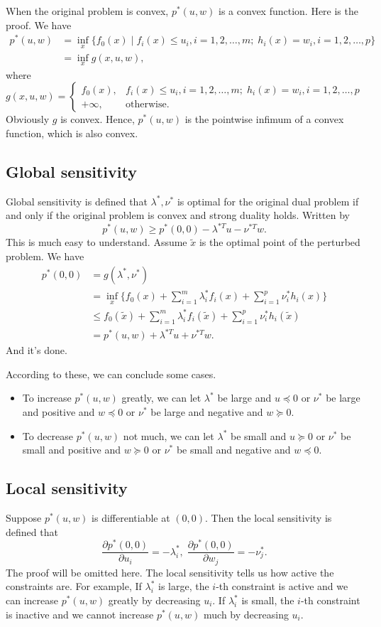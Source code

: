 \documentclass[lang=en,color=blue,mode=fancy,titlestyle=hang]{elegantbook}
\begin{document}
When the original problem is convex, $p^*(u, w)$ is a convex function. Here is the proof. We have
\begin{align*}
p^*(u, w) &= \inf_x \{f_0(x) \;|\; f_i(x) \leq u_i, i = 1, 2, \ldots, m; \; h_i(x) = w_i, i = 1, 2, \ldots, p\}\\
&= \inf_x g(x, u, w),
\end{align*}
where \[
g(x, u, w) = \begin{cases}
f_0(x), & f_i(x) \leq u_i, i = 1, 2, \ldots, m; \; h_i(x) = w_i, i = 1, 2, \ldots, p\\
+ \infty, & \text{otherwise}.
\end{cases}
\]
Obviously $g$ is convex. Hence, $p^*(u, w)$ is the pointwise infimum of a  convex function, which is
also convex.

\subsection{Global sensitivity}
Global sensitivity is defined that $\lambda^*, \nu^*$ is optimal for the original dual problem
if and only if the original problem is convex and strong duality holds. Written by
\[
p^*(u, w) \geq p^*(0, 0) - \lambda^{*T} u - \nu^{*T} w.
\]
This is much easy to understand. Assume $\tilde{x}$ is the optimal point of the perturbed problem.
We have
\begin{align*}
p^*(0, 0) &= g(\lambda^*, \nu^*)\\
&= \inf_x \{f_0(x) + \sum_{i=1}^m \lambda_i^* f_i(x) + \sum_{i=1}^p \nu_i^* h_i(x)\}\\
&\leq f_0(\tilde{x}) + \sum_{i=1}^m \lambda_i^* f_i(\tilde{x}) + \sum_{i=1}^p \nu_i^* h_i(\tilde{x})\\
&= p^*(u, w) + \lambda^{*T} u + \nu^{*T} w.
\end{align*}
And it's done.

According to these, we can conclude some cases.
\begin{itemize}
  \item To increase $p^*(u, w)$ greatly, we can let $\lambda^*$ be large and $u \preceq 0$
  or $\nu^*$ be large and positive and $w \preceq 0$ or $\nu^*$ be large and negative and $w \succeq 0$.
  \item To decrease $p^*(u, w)$ not much, we can let $\lambda^*$ be small and $u \succeq 0$
  or $\nu^*$ be small and positive and $w \succeq 0$ or $\nu^*$ be small and negative and $w \preceq 0$.
\end{itemize}

\subsection{Local sensitivity}
Suppose $p^*(u, w)$ is differentiable at $(0, 0)$. Then the local sensitivity is defined that
\[
\frac{\partial p^*(0, 0)}{\partial u_i} = - \lambda^*_i, \; \frac{\partial p^*(0, 0)}{\partial w_j} = - \nu^*_j.
\]
The proof will be omitted here. The local sensitivity tells us how active the constraints are.
For example, If $\lambda_i^*$ is large, the $i$-th constraint is active and we can increase $p^*(u, w)$
greatly by decreasing $u_i$. If $\lambda_i^*$ is small, the $i$-th constraint is inactive and we cannot
increase $p^*(u, w)$ much by decreasing $u_i$.
\end{document}

